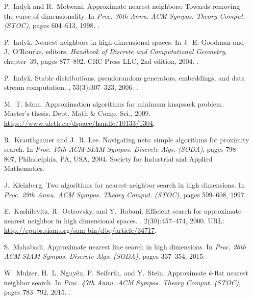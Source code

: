 \documentclass[12pt]{article}\usepackage[cm]{fullpage}
\theoremstyle{remark}\theoremheaderfont{\sf}\theorembodyfont{\upshape}\newtheorem{defn}[theorem]{Definition}
\numberwithin{figure}{section}\numberwithin{table}{section}\numberwithin{equation}{section}
\begin{document}
\begin{thebibliography}{CLMW11}
P.~Indyk and R.~Motwani.
\newblock Approximate nearest neighbors: {Towards} removing the curse of
  dimensionality.
\newblock In {\em Proc. 30th Annu. ACM Sympos. Theory Comput. {\em(STOC)}},
  pages 604--613, 1998.
\newblock \href {http://dx.doi.org/10.1145/276698.276876}
  {}.

P.~Indyk.
\newblock Nearest neighbors in high-dimensional spaces.
\newblock In J.~E. Goodman and J.~O'Rourke, editors, {\em Handbook of Discrete
  and Computational Geometry}, chapter~39, pages 877--892. CRC Press LLC, 2nd
  edition, 2004.
\newblock \href {http://dx.doi.org/10.1201/9781420035315.ch39}
  {}.

P.~Indyk.
\newblock Stable distributions, pseudorandom generators, embeddings, and data
  stream computation.
, 53(3):307--323, 2006.
\newblock \href {http://dx.doi.org/10.1145/1147954.1147955}
  {}.

M.~T. Islam.
\newblock Approximation algorithms for minimum knapsack problem.
\newblock Master's thesis, Dept. Math \& Comp. Sci., 2009.
\newblock \url{https://www.uleth.ca/dspace/handle/10133/1304}.

R.~Krauthgamer and J.~R. Lee.
\newblock Navigating nets: simple algorithms for proximity search.
\newblock In {\em Proc. 15th ACM-SIAM Sympos. Discrete Algs. {\em(SODA)}},
  pages 798--807, Philadelphia, PA, USA, 2004. Society for Industrial and
  Applied Mathematics.

J.~Kleinberg.
\newblock Two algorithms for nearest-neighbor search in high dimensions.
\newblock In {\em Proc. 29th Annu. ACM Sympos. Theory Comput. {\em(STOC)}},
  pages 599--608, 1997.

E.~Kushilevitz, R.~Ostrovsky, and Y.~Rabani.
\newblock Efficient search for approximate nearest neighbor in high dimensional
  spaces.
, 2(30):457--474, 2000.
\newblock URL: \url{http://epubs.siam.org/sam-bin/dbq/article/34717}.

S.~Mahabadi.
\newblock Approximate nearest line search in high dimensions.
\newblock In {\em Proc. 26th ACM-SIAM Sympos. Discrete Algs. {\em(SODA)}},
  pages 337--354, 2015.

W.~Mulzer, H.~L. Nguy{\^{e}}n, P.~Seiferth, and Y.~Stein.
\newblock Approximate $k$-flat nearest neighbor search.
\newblock In {\em Proc. 47th Annu. ACM Sympos. Theory Comput. {\em(STOC)}},
  pages 783--792, 2015.
\newblock \href {http://dx.doi.org/10.1145/2746539.2746559}
  {}.


\end{thebibliography}
\end{document}
